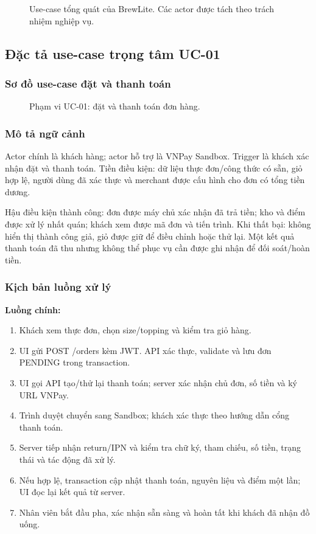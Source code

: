 \documentclass[12pt,a4paper]{article}
\begin{document}
\begin{figure}[p]\centering

\caption{Use-case tổng quát của BrewLite. Các actor được tách theo trách nhiệm nghiệp vụ.}
\label{fig:usecase-tong}
\end{figure}
\clearpage

\subsection{Đặc tả use-case trọng tâm UC-01}
\subsubsection{Sơ đồ use-case đặt và thanh toán}
\begin{figure}[H]\centering

\caption{Phạm vi UC-01: đặt và thanh toán đơn hàng.}
\label{fig:usecase-chinh}
\end{figure}

\subsubsection{Mô tả ngữ cảnh}
Actor chính là khách hàng; actor hỗ trợ là VNPay Sandbox. Trigger là khách xác nhận đặt và thanh toán. Tiền điều kiện: dữ liệu thực đơn/công thức có sẵn, giỏ hợp lệ, người dùng đã xác thực và merchant được cấu hình cho đơn có tổng tiền dương.

Hậu điều kiện thành công: đơn được máy chủ xác nhận đã trả tiền; kho và điểm được xử lý nhất quán; khách xem được mã đơn và tiến trình. Khi thất bại: không hiển thị thành công giả, giỏ được giữ để điều chỉnh hoặc thử lại. Một kết quả thanh toán đã thu nhưng không thể phục vụ cần được ghi nhận để đối soát/hoàn tiền.

\subsubsection{Kịch bản luồng xử lý}
\textbf{Luồng chính:}
\begin{enumerate}
\item Khách xem thực đơn, chọn size/topping và kiểm tra giỏ hàng.
\item UI gửi POST /orders kèm JWT. API xác thực, validate và lưu đơn PENDING trong transaction.
\item UI gọi API tạo/thử lại thanh toán; server xác nhận chủ đơn, số tiền và ký URL VNPay.
\item Trình duyệt chuyển sang Sandbox; khách xác thực theo hướng dẫn cổng thanh toán.
\item Server tiếp nhận return/IPN và kiểm tra chữ ký, tham chiếu, số tiền, trạng thái và tác động đã xử lý.
\item Nếu hợp lệ, transaction cập nhật thanh toán, nguyên liệu và điểm một lần; UI đọc lại kết quả từ server.
\item Nhân viên bắt đầu pha, xác nhận sẵn sàng và hoàn tất khi khách đã nhận đồ uống.
\end{enumerate}
\end{document}
